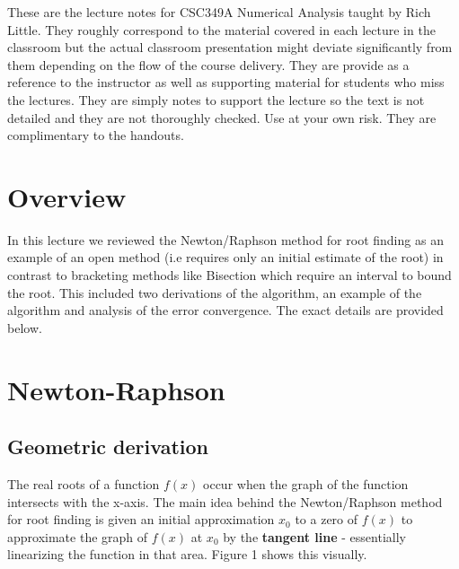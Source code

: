 \documentclass [titlepage,12pt,letter] {article}
\begin{document}
 


These are the lecture notes for CSC349A Numerical Analysis taught by
Rich Little. They roughly correspond to
the material covered in each lecture in the classroom but the actual
classroom presentation might deviate significantly from them depending
on the flow of the course delivery. They are provide as a reference to
the instructor as well as supporting material for students who miss
the lectures. They are simply notes to support the lecture so the text
is not detailed and they are not thoroughly checked. Use at your own
risk. They are complimentary to the handouts.

\section{Overview} 

In this lecture we reviewed the Newton/Raphson method
for root finding as an example of an open method (i.e requires only an
initial estimate of the root) in contrast to bracketing methods like
Bisection which require an interval to bound the root. This included two derivations 
of the algorithm, an example of the algorithm and analysis of the error convergence.
The exact details are provided below.


\section{Newton-Raphson} 

\subsection{Geometric derivation}

The real roots of a function $f(x)$ occur when the graph of the
function intersects with the x-axis. The main idea behind the
Newton/Raphson method for root finding is given an initial
approximation $x_0$ to a zero of $f(x)$ to approximate the graph of $f(x)$
at $x_0$ by the {\bf tangent line} - essentially linearizing the function in
that area. Figure 1 shows this visually. 
\end{document}
